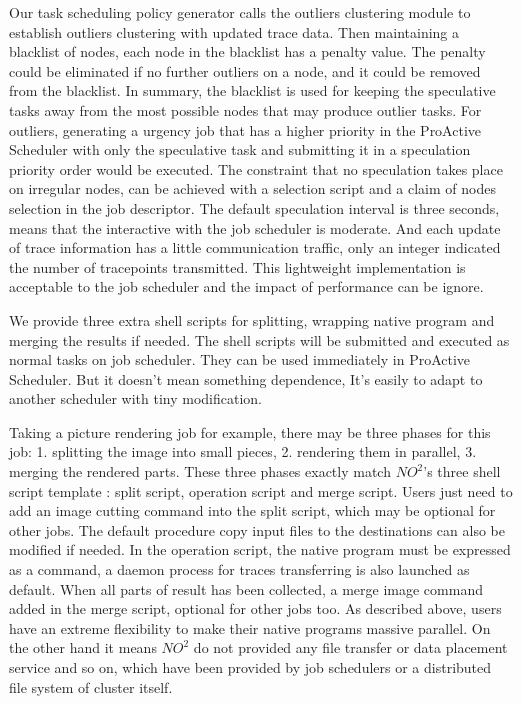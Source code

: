 Our task scheduling policy generator calls the outliers clustering module to establish outliers clustering with updated trace data. Then maintaining a blacklist of nodes, each node in the blacklist has a penalty value. The penalty could be eliminated if no further outliers on a node, and it could be removed from the blacklist. In summary, the blacklist is used for keeping the speculative tasks away from the most possible nodes that may produce outlier tasks. For outliers, generating a urgency job that has a higher priority in the ProActive Scheduler with only the speculative task and submitting it in a speculation priority order would be executed. The constraint that no speculation takes place on irregular nodes, can be achieved with a selection script and a claim of nodes selection in the job descriptor. The default speculation interval is three seconds, means that the interactive with the job scheduler is moderate. And each update of trace information has a little communication traffic, only an integer indicated the number of  tracepoints transmitted. This lightweight implementation is acceptable to the job scheduler and the impact of performance can be ignore.

We provide three extra shell scripts for splitting, wrapping native program and merging the results if needed. The shell scripts will be submitted and executed as normal tasks on job scheduler. They can be used immediately in ProActive Scheduler. But it doesn't mean something dependence, It’s easily to adapt to another scheduler with tiny modification.

Taking a picture rendering job for example, there may be three phases for this job: 1. splitting the image into small pieces, 2. rendering them in parallel, 3. merging the rendered parts. These three phases exactly match $NO^2$'s three shell script template : split script, operation script and merge script. Users just need to add an image cutting command into the split script, which may be optional for other jobs. The default procedure copy input files to the destinations can also be modified if needed. In the operation script, the native program must be expressed as a command, a daemon process for traces transferring is also launched as default. When all parts of result has been collected, a merge image command added in the merge script, optional for other jobs too. As described above,  users have an extreme flexibility to make their native programs massive parallel. On the other hand it means $NO^2$ do not provided any file transfer or data placement service and so on, which have been provided by job schedulers or a distributed file system of cluster itself.

